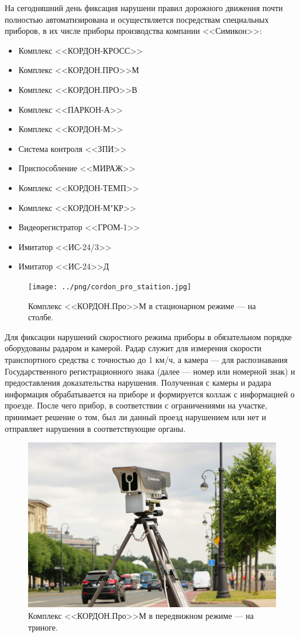 \documentclass[specification,annotation,times]{itmo-student-thesis}
\begin{document}
На сегодняшний день фиксация нарушени правил дорожного движения почти полностью автоматизирована и осуществляется посредствам специальных приборов, в их числе приборы производства компании <<Симикон>>:
{\begin{itemize}
	\item Комплекс <<КОРДОН-КРОСС>>
	\item Комплекс <<КОРДОН.ПРО>>М
	\item Комплекс <<КОРДОН.ПРО>>В
	\item Комплекс <<ПАРКОН-А>>
	\item Комплекс <<КОРДОН-М>>
	\item Система контроля <<ЗПИ>>
	\item Приспособление <<МИРАЖ>>
	\item Комплекс <<КОРДОН-ТЕМП>>
	\item Комплекс <<КОРДОН-М"КР>>
	\item Видеорегистратор <<ГРОМ-1>>
	\item Имитатор <<ИС-24/3>>
	\item Имитатор <<ИС-24>>Д
\end{itemize}}

\begin{figure}[!ht]
	\caption{Комплекс <<КОРДОН.Про>>М в стационарном режиме --- на столбе.}\label{img:cordon-state}
	\texttt{[image: ../png/cordon\_pro\_staition.jpg]}
	\centering
\end{figure}

Для фиксации нарушений скоростного режима приборы в обязательном порядке оборудованы радаром и камерой. Радар служит для измерения скорости транспортного средства с точностью до 1 км/ч, а камера --- для распознавания Государственного регистрационного знака (далее --- номер или номерной знак) и предоставления доказательства нарушения. Полученная с камеры и радара информация обрабатывается на приборе и формируется коллаж с информацией о проезде. После чего прибор, в соответствии с ограничениями на участке, принимает решение о том, был ли данный проезд нарушением или нет и отправляет нарушения в соответствующие органы.

\begin{figure}[!ht]
	\caption{Комплекс <<КОРДОН.Про>>М в передвижном режиме --- на триноге.}\label{img:cordon-move}
	\includegraphics[width=0.85\linewidth]{../png/cordon_pro_2.jpg}
	\centering
\end{figure}
\end{document}
